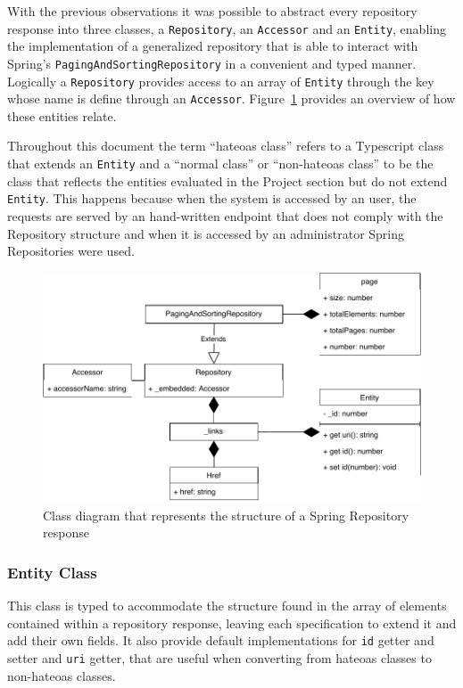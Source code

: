 With the previous observations it was possible to abstract every repository response into three classes, a \texttt{Repository}, an \texttt{Accessor} and an \texttt{Entity}, enabling the implementation of a generalized repository that is able to interact with Spring's \texttt{PagingAndSortingRepository} in a convenient and typed manner.
Logically a \texttt{Repository} provides access to an array of \texttt{Entity} through the key whose name is define through an \texttt{Accessor}. Figure~\ref{fig:springresponse} provides an overview of how these entities relate.

Throughout this document the term ``hateoas class'' refers to a Typescript class that extends an \texttt{Entity} and a ``normal class'' or ``non-hateoas class'' to be the class that reflects the entities evaluated in the Project section but do not extend \texttt{Entity}. This happens because when the system is accessed by an user, the requests are served by an hand-written endpoint that does not comply with the Repository structure and when it is accessed by an administrator Spring Repositories were used.

\begin{figure}
  \centering
  \includegraphics[width=.8\textwidth]{images/diagramas/hateoas_diagram}
  \caption{Class diagram that represents the structure of a Spring Repository response}\label{fig:springresponse}
\end{figure}



\subsubsection{Entity Class}
This class is typed to accommodate the structure found in the array of elements contained within a repository response, leaving each specification to extend it and add their own fields. It also provide default implementations for \texttt{id} getter and setter and \texttt{uri} getter, that are useful when converting from hateoas classes to non-hateoas classes.

